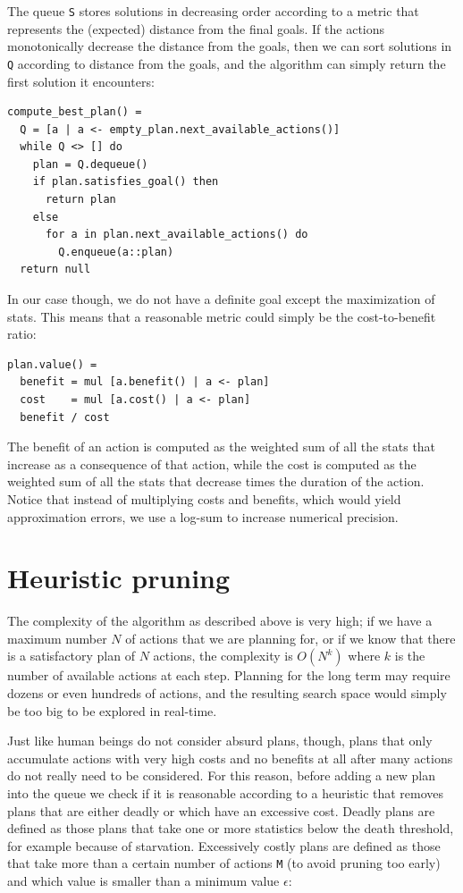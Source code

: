 The queue \texttt{S} stores solutions in decreasing order according to a metric that represents the (expected) distance from the final goals. If the actions monotonically decrease the distance from the goals, then we can sort solutions in \texttt{Q} according to distance from the goals, and the algorithm can simply return the first solution it encounters:

\begin{lstlisting}
compute_best_plan() =
  Q = [a | a <- empty_plan.next_available_actions()]
  while Q <> [] do
    plan = Q.dequeue()
    if plan.satisfies_goal() then
      return plan
    else
      for a in plan.next_available_actions() do
        Q.enqueue(a::plan)
  return null
\end{lstlisting}

In our case though, we do not have a definite goal except the maximization of stats. This means that a reasonable metric could simply be the cost-to-benefit ratio:

\begin{lstlisting}
plan.value() =
  benefit = mul [a.benefit() | a <- plan]
  cost    = mul [a.cost() | a <- plan]
  benefit / cost
\end{lstlisting}

The benefit of an action is computed as the weighted sum of all the stats that increase as a consequence of that action, while the cost is computed as the weighted sum of all the stats that decrease times the duration of the action. Notice that instead of multiplying costs and benefits, which would yield approximation errors, we use a log-sum to increase numerical precision.


\section{Heuristic pruning}
\label{sec:heuristic_pruning}

The complexity of the algorithm as described above is very high; if we have a maximum number $N$ of actions that we are planning for, or if we know that there is a satisfactory plan of $N$ actions, the complexity is $O(N^k)$ where $k$ is the number of available actions at each step. Planning for the long term may require dozens or even hundreds of actions, and the resulting search space would simply be too big to be explored in real-time.

Just like human beings do not consider absurd plans, though, plans that only accumulate actions with very high costs and no benefits at all after many actions do not really need to be considered. For this reason, before adding a new plan into the queue we check if it is reasonable according to a heuristic that removes plans that are either deadly or which have an excessive cost. Deadly plans are defined as those plans that take one or more statistics below the death threshold, for example because of starvation. Excessively costly plans are defined as those that take more than a certain number of actions \texttt{M} (to avoid pruning too early) and which value is smaller than a minimum value $\epsilon$:

